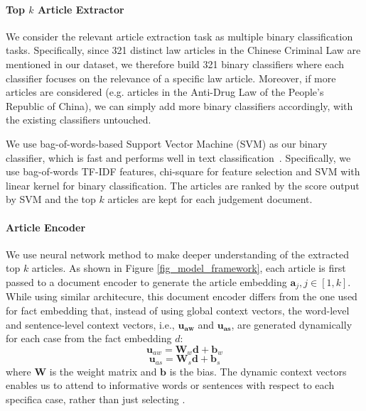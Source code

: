 \paragraph{Top $k$ Article Extractor}
\label{sec_article_extractor}
We consider the relevant article extraction task as multiple binary classification tasks. Specifically, since 321 distinct law articles in the Chinese Criminal Law are mentioned in our dataset, we therefore build 321 binary classifiers where each classifier focuses on the relevance of a specific law article. Moreover, if more articles are considered (e.g. articles in the Anti-Drug Law of the People's Republic of China), we can simply add more binary classifiers accordingly, with the existing classifiers untouched.

We use bag-of-words-based Support Vector Machine (SVM) as our binary classifier, which is fast and performs well in text classification~\cite{joachims2002learning,wang2012baselines}. Specifically, we use bag-of-words TF-IDF features, chi-square for feature selection and SVM with linear kernel for binary classification. The articles are ranked by the score output by SVM and the top $k$ articles are kept for each judgement document.

\paragraph{Article Encoder}
\label{sec_article_encoder}
We use neural network method to make deeper understanding of the extracted top $k$ articles. 
As shown in Figure \ref{fig_model_framework}, each article is first passed to a document encoder to generate the article embedding $\mathbf{a}_j, j\in [1, k]$. 
While using similar architecure, this document encoder differs from the one used for fact embedding that, instead of using global context vectors, the word-level and sentence-level context vectors, i.e., $\mathbf{u_{aw}}$ and $\mathbf{u_{as}}$, are generated dynamically for each case from the fact embedding $d$:
\begin{equation}
\mathbf{u}_{aw} = \mathbf{W}_w \mathbf{d} + \mathbf{b}_w
\end{equation}
\begin{equation}
\mathbf{u}_{as} = \mathbf{W}_s \mathbf{d} + \mathbf{b}_s
\end{equation}
where $\mathbf{W}$ is the weight matrix and $\mathbf{b}$ is the bias. The dynamic context vectors enables us to attend to informative words or sentences with respect to each specifica case, rather than just selecting .

